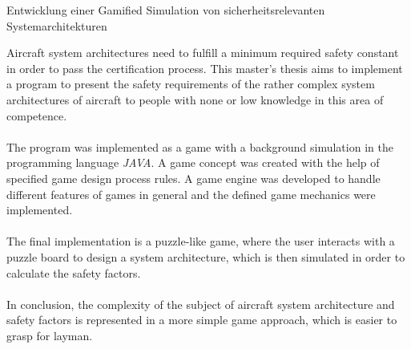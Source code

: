 
{\LARGE Entwicklung einer Gamified Simulation von sicherheitsrelevanten Systemarchitekturen}

Aircraft system architectures need to fulfill a minimum required safety constant in order to pass the certification process.
This master’s thesis aims to implement a program to present the safety requirements of the rather complex system architectures
of aircraft to people with none or low knowledge in this area of competence.
\\ \\
The program was implemented as a game with a background simulation in the programming language \textit{JAVA}.
A game concept was created with the help of specified game design process rules.
A game engine was developed to handle different features of games in general and the defined game mechanics were implemented.
\\ \\
The final implementation is a puzzle-like game, where the user interacts with a puzzle board to design a system architecture,
which is then simulated in order to calculate the safety factors.
\\ \\
In conclusion, the complexity of the subject of aircraft system architecture and safety factors is represented in a more simple
game approach, which is easier to grasp for layman.

